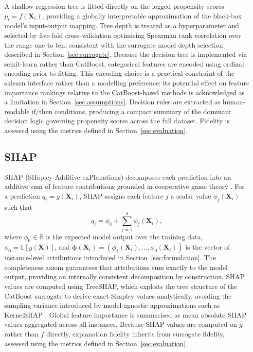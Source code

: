 \documentclass[oneside]{memoir} %
\begin{document}
A shallow regression tree is fitted directly on the logged propensity scores $p_i = f(\mathbf{X}_i)$, providing a globally interpretable approximation of the black-box model's input-output mapping. Tree depth is treated as a hyperparameter and selected by five-fold cross-validation optimising Spearman rank correlation over the range one to ten, consistent with the surrogate model depth selection described in Section~\ref{sec:surrogate}. Because the decision tree is implemented via scikit-learn rather than CatBoost, categorical features are encoded using ordinal encoding prior to fitting. This encoding choice is a practical constraint of the sklearn interface rather than a modelling preference; its potential effect on feature importance rankings relative to the CatBoost-based methods is acknowledged as a limitation in Section~\ref{sec:assumptions}. Decision rules are extracted as human-readable if/then conditions, producing a compact summary of the dominant decision logic governing propensity scores across the full dataset. Fidelity is assessed using the metrics defined in Section~\ref{sec:evaluation}.

\subsection{SHAP}

SHAP (SHapley Additive exPlanations) decomposes each prediction into an additive sum of feature contributions grounded in cooperative game theory \parencite{lundberg_unified_2017}. For a prediction $q_i = g(\mathbf{X}_i)$, SHAP assigns each feature $j$ a scalar value $\phi_j(\mathbf{X}_i)$ such that
\[
q_i = \phi_0 + \sum_{j=1}^{d} \phi_j(\mathbf{X}_i),
\]
where $\phi_0 \in \mathbb{R}$ is the expected model output over the training data, $\phi_0 = \mathbb{E}[g(\mathbf{X})]$, and $\boldsymbol{\phi}(\mathbf{X}_i) = (\phi_1(\mathbf{X}_i), \ldots, \phi_d(\mathbf{X}_i))$ is the vector of instance-level attributions introduced in Section~\ref{sec:formulation}. The completeness axiom guarantees that attributions sum exactly to the model output, providing an internally consistent decomposition by construction. SHAP values are computed using TreeSHAP, which exploits the tree structure of the CatBoost surrogate to derive exact Shapley values analytically, avoiding the sampling variance introduced by model-agnostic approximations such as KernelSHAP \parencite{lundberg_unified_2017}. Global feature importance is summarised as mean absolute SHAP values aggregated across all instances. Because SHAP values are computed on $g$ rather than $f$ directly, explanation fidelity inherits from surrogate fidelity, assessed using the metrics defined in Section~\ref{sec:evaluation}.
\end{document}
